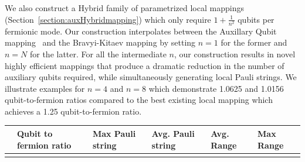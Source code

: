 We also construct a Hybrid\+ family of parametrized local mappings (Section~\ref{section:auxHybridmapping}) which only require $1+\frac{1}{n^2}$ qubits per fermionic mode. Our construction interpolates between the Auxillary Qubit mapping~\cite{Verstraete_2005, steudtner2019quantum} and the Bravyi-Kitaev mapping by setting $n=1$ for the former and $n=N$ for the latter. For all the intermediate $n$, our construction results in novel highly efficient mappings that produce a dramatic reduction in the number of auxiliary qubits required, while simultaneously generating local Pauli strings. We illustrate examples for $n=4$ and $n=8$ which demonstrate 1.0625 and 1.0156 qubit-to-fermion ratios compared to the best existing local mapping \cite{chen2022equivalence} which achieves a 1.25 qubit-to-fermion ratio.

\begin{table}
\centering
\small
    \begin{tabular}{k{6em} k{4.3em} k{4.5em} k{4.6em} k{5em} k{4.6em}}
        \hline \hline
         & Qubit to fermion ratio  &Max Pauli string & Avg. Pauli string & Avg. Range & Max Range\\ \hline {}
        

\end{tabular}
\end{table}

